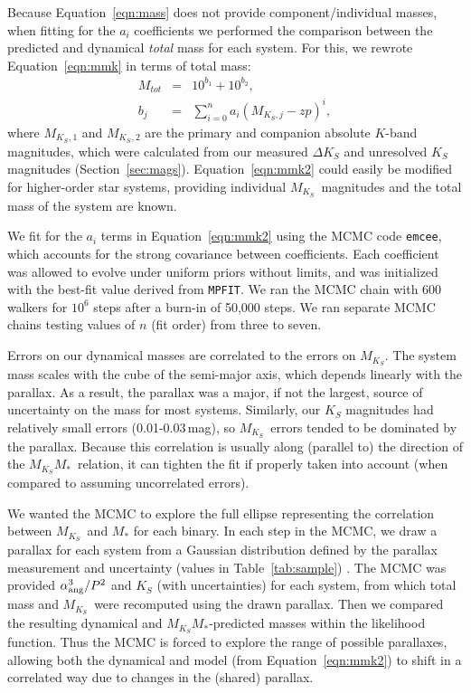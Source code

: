 \documentclass[twocolumn]{aastex62}
\newcommand{\mks}{$M_{K_S}$}
\newcommand{\mmk}{$M_{K_S}$\textendash$M_*$}
\begin{document}
Because Equation~\ref{eqn:mass} does not provide component/individual masses, when fitting for the $a_i$ coefficients we performed the comparison between the predicted and dynamical {\it total} mass for each system. For this, we rewrote Equation~\ref{eqn:mmk} in terms of total mass:
\begin{eqnarray}\label{eqn:mmk2}
M_{tot} &=& 10^{b_1} + 10^{b_2},\\
b_j &=& \sum_{i=0}^{n} a_i(M_{K_S,j}-zp)^i, \label{eqn:mmk2_b}
\end{eqnarray}
where \mks$_{,1}$ and \mks$_{,2}$ are the primary and companion absolute $K$-band magnitudes, which were calculated from our measured $\Delta K_S$ and unresolved $K_S$ magnitudes (Section~\ref{sec:mags}). Equation~\ref{eqn:mmk2} could easily be modified for higher-order star systems, providing individual \mks\ magnitudes and the total mass of the system are known. 

We fit for the $a_i$ terms in Equation~\ref{eqn:mmk2} using the MCMC code {\tt emcee}, which accounts for the strong covariance between coefficients. Each coefficient was allowed to evolve under uniform priors without limits, and was initialized with the best-fit value derived from {\tt MPFIT}. We ran the MCMC chain with 600 walkers for $10^6$ steps after a burn-in of 50,000 steps. We ran separate MCMC chains testing values of $n$ (fit order) from three to seven. 

Errors on our dynamical masses are correlated to the errors on \mks. The system mass scales with the cube of the semi-major axis, which depends linearly with the parallax. As a result, the parallax was a major, if not the largest, source of uncertainty on the mass for most systems. Similarly, our $K_S$ magnitudes had relatively small errors (0.01-0.03\,mag), so \mks\ errors tended to be dominated by the parallax. Because this correlation is usually along (parallel to) the direction of the \mmk\ relation, it can tighten the fit if properly taken into account (when compared to assuming uncorrelated errors). 

We wanted the MCMC to explore the full ellipse representing the correlation between \mks\ and $M_*$ for each binary. In each step in the MCMC, we draw a parallax for each system from a Gaussian distribution defined by the parallax measurement and uncertainty (values in Table~\ref{tab:sample}) . The MCMC was provided $\alpha_{\rm{ang}}^3/P^2$ and $K_S$ (with uncertainties) for each system, from which total mass and \mks\ were recomputed using the drawn parallax. Then we compared the resulting dynamical and \mmk-predicted masses within the likelihood function. Thus the MCMC is forced to explore the range of possible parallaxes, allowing both the dynamical and model (from Equation~\ref{eqn:mmk2}) to shift in a correlated way due to changes in the (shared) parallax. 
\end{document}
